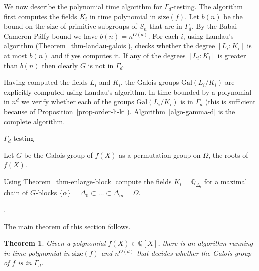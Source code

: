 \documentclass[11pt]{madras}%
\newtheorem{theorem}{Theorem}[chapter]
\theoremstyle{remark}
\newcommand{\Gal}[1]{{\ensuremath{\mathrm{Gal}\left(#1\right)}}}
\newcommand{\size}[1]{{\ensuremath{\mathrm{size}\left(#1\right)}}}
\begin{document}
We now describe the polynomial time algorithm for $\Gamma_d$-testing.
The algorithm first computes the fields $K_i$ in time polynomial in
$\size{f}$. Let $b(n)$ be the bound on the size of primitive subgroups
of $S_n$ that are in $\Gamma_d$. By the Babai-Cameron-P\'alfy bound we
have $b(n) = n^{O(d)}$. For each $i$, using Landau's algorithm
(Theorem~\ref{thm-landau-galois}), checks whether the degree
$[L_i:K_i]$ is at most $b(n)$ and if yes computes it.  If any of the
degrees $[L_i:K_i]$ is greater than $b(n)$ then clearly $G$ is not in
$\Gamma_d$.

Having computed the fields $L_i$ and $K_i$, the Galois groups
$\Gal{L_i/K_i}$ are explicitly computed using Landau's algorithm. In
time bounded by a polynomial in $n^d$ we verify whether each of the
groups $\Gal{L_i/K_i}$ is in $\Gamma_d$ (this is sufficient because of
Proposition~\ref{prop-order-li-ki}).  Algorithm~\ref{algo-gamma-d} is
the complete algorithm.

\begin{algorithm}
  \caption{$\Gamma_d$-testing}\label{algo-gamma-d}%

  Let $G$ be the Galois group of $f(X)$ as a permutation group on
  $\Omega$, the roots of $f(X)$.

  Using Theorem~\ref{thm-enlarge-block} compute the fields $K_i =
  \mathbb{Q}_{\Delta_i}$ for a maximal chain of $G$-blocks $\{ \alpha
  \} = \Delta_0 \subset \ldots \subset \Delta_m = \Omega$.

   {%

    \lElse{ 
      \lIf{$\Gal{L_i/K_i}$ is not in $\Gamma_d$}{\KwSty{Reject}.}%
    }%
  }%

  .
\end{algorithm}

The main theorem of this section follows.

\begin{theorem}\label{thm-gammad-test}%
  Given a polynomial $f(X) \in \mathbb{Q}[X]$, there is an algorithm
  running in time polynomial in $\size{f}$ and $n^{O(d)}$ that decides
  whether the Galois group of $f$ is in $\Gamma_d$.
\end{theorem}
\end{document}
